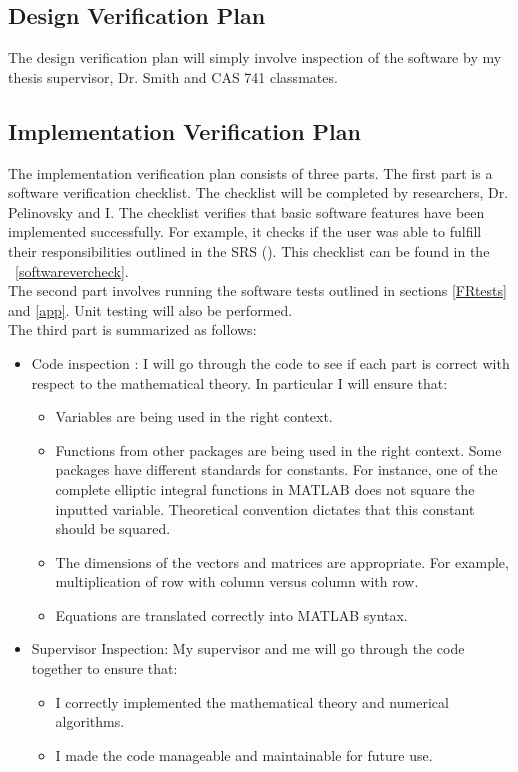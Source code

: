 \documentclass[12pt, titlepage]{article}
\begin{document}
\subsection{Design Verification Plan}
\label{DesignVerificationPlan}
The design verification plan will simply involve inspection of the software by 
my thesis supervisor, Dr$.$ Smith and CAS 741 classmates.  

\subsection{Implementation Verification Plan}
\label{ImplementationVerPlan}
The implementation verification plan consists of three parts. The first part 
is a software verification checklist. The checklist will be completed by 
researchers, Dr$.$ Pelinovsky and I. The checklist verifies that basic 
software features have been implemented successfully. 
For example, it checks if the user was able to fulfill their responsibilities 
outlined in the SRS (\cite{SRS}). 
This checklist can be found in the ~\ref{softwarevercheck}.\\

 The second part involves running the software tests outlined in sections 
 \ref{FRtests} and 
 \ref{app}. Unit testing will also be performed. \\
 
The third part is summarized as follows: 
 \label{staticVertech}
 \begin{itemize}
 	\item Code inspection : I will 
 	go through the code to see if each part is correct with respect to the
 	mathematical theory. In particular I will ensure that: 
 	\begin{itemize}
 		\item Variables are being used in the right context. 
 		\item Functions from other packages are being used in the right 
 		context. Some packages have different standards for 
 		constants. For instance, one of the complete elliptic integral 
 		functions in MATLAB does not square the inputted variable. Theoretical 
 		convention dictates that this constant should be squared. 
 		\item The dimensions of the vectors and matrices are appropriate. For 
 		example, multiplication of row with column versus column with row.
 		\item Equations are translated correctly into MATLAB syntax.  
 	\end{itemize} 
 	\item Supervisor Inspection: My supervisor and me will go through the code 
 	together to ensure that: 
 	\begin{itemize}
 		\item I correctly implemented the mathematical theory and numerical 
 		algorithms.
 		\item I made the code manageable and maintainable for future use.
 	\end{itemize} 
 \end{itemize}
\end{document}
